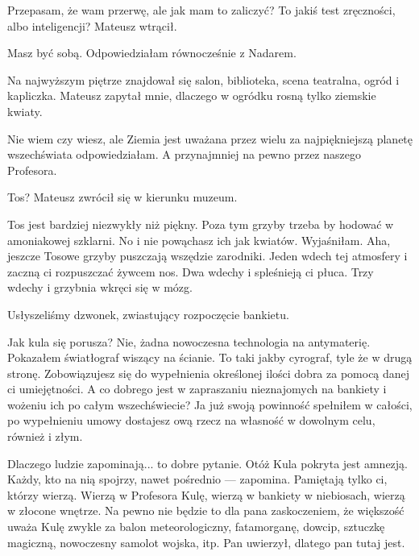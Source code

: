 \ds{} Przepasam, że wam przerwę, ale jak mam to zaliczyć? To jakiś test zręczności, albo inteligencji? \dm{} Mateusz wtrącił. \de{}

\ds{} Masz być sobą. \dm{} Odpowiedziałam równocześnie z Nadarem. \de{}

Na najwyższym piętrze znajdował się salon, biblioteka, scena teatralna, ogród i kapliczka.
Mateusz zapytał mnie, dlaczego w ogródku rosną tylko ziemskie kwiaty.

\ds{} Nie wiem czy wiesz, ale Ziemia jest uważana przez wielu za najpiękniejszą planetę wszechświata \dm{} odpowiedziałam. \dm{}
A przynajmniej na pewno przez naszego Profesora. \de{}

\ds{} Tos? \dm{} Mateusz zwrócił się w kierunku muzeum. \de{}

\ds{} Tos jest bardziej niezwykły niż piękny. Poza tym grzyby trzeba by hodować w amoniakowej szklarni.
No i nie powąchasz ich jak kwiatów. \ds{} Wyjaśniłam. \dm{} Aha, jeszcze Tosowe grzyby puszczają wszędzie zarodniki. 
Jeden wdech tej atmosfery i zaczną ci rozpuszczać żywcem nos. Dwa wdechy i spleśnieją ci płuca. Trzy wdechy i grzybnia wkręci się w mózg. \de{}

Usłyszeliśmy dzwonek, zwiastujący rozpoczęcie bankietu.

Jak kula się porusza? Nie, żadna nowoczesna technologia na antymaterię. Pokazałem światłograf wiszący na ścianie. To taki jakby cyrograf, tyle że w drugą stronę.
Zobowiązujesz się do wypełnienia określonej ilości dobra za pomocą danej ci umiejętności.
A co dobrego jest w zapraszaniu nieznajomych na bankiety i wożeniu ich po całym wszechświecie?
Ja już swoją powinność spełniłem w całości, po wypełnieniu umowy dostajesz ową rzecz na własność w dowolnym celu, również i złym.

Dlaczego ludzie zapominają... to dobre pytanie.
Otóż Kula pokryta jest amnezją. Każdy, kto na nią spojrzy, nawet pośrednio --- zapomina.
Pamiętają tylko ci, którzy wierzą. Wierzą w Profesora Kulę, wierzą w bankiety w niebiosach, wierzą w złocone wnętrze.
Na pewno nie będzie to dla pana zaskoczeniem, że większość uważa Kulę zwykle za balon meteorologiczny, fatamorganę, dowcip, sztuczkę magiczną, nowoczesny samolot wojska, itp.
Pan uwierzył, dlatego pan tutaj jest.





